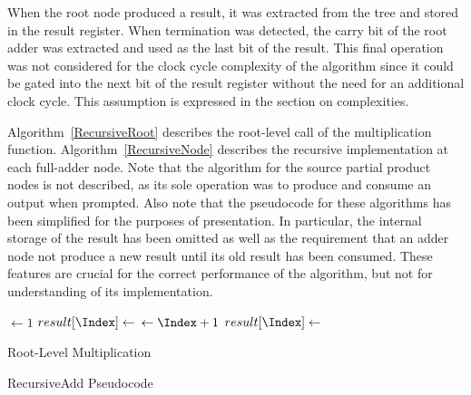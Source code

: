 \documentclass{article}
\begin{document}
When the root node produced a result, it was extracted from the tree and stored in the result register. When termination was detected, the carry bit of the root adder was extracted and used as the last bit of the result. This final operation was not considered for the clock cycle complexity of the algorithm since it could be gated into the next bit of the result register without the need for an additional clock cycle. This assumption is expressed in the section on complexities.

Algorithm~\ref{RecursiveRoot} describes the root-level call of the multiplication function. Algorithm~\ref{RecursiveNode} describes the recursive implementation at each full-adder node. Note that the algorithm for the source partial product nodes is not described, as its sole operation was to produce and consume an output when prompted. Also note that the pseudocode for these algorithms has been simplified for the purposes of presentation. In particular, the internal storage of the result has been omitted as well as the requirement that an adder node not produce a new result until its old result has been consumed. These features are crucial for the correct performance of the algorithm, but not for understanding of its implementation.

\begin{algorithm}[h]
		
	
	\BlankLine
	\Index $\leftarrow 1$\;
	{
		{
			$result[\Index] \leftarrow$ \;
			\Index $\leftarrow \Index+1$\;
		}
	}
	$result[\Index] \leftarrow$ \;
	\caption{Root-Level Multiplication}
	\label{RecursiveRoot}
\end{algorithm}

\begin{algorithm}[h]
	
	
	\BlankLine	\If{\Result{\Left} \And \Result{\Right}}
	{
		\;
		\Notify{}\;
	}
	\RecAdd{\Left}\;
	\RecAdd{\Right}\;
	\caption{RecursiveAdd Pseudocode}
	\label{RecursiveNode}
\end{algorithm}
\end{document}
